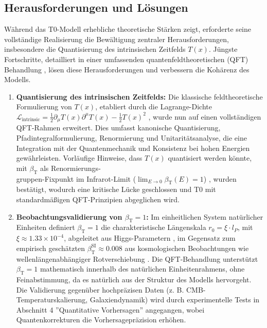 \documentclass[12pt,a4paper]{article}
\newcommand{\Tfield}{T(x)}
\newcommand{\betaT}{\beta_{\text{T}}}
\newcommand{\calL}{\mathcal{L}}
\begin{document}
	\subsection{Herausforderungen und Lösungen}
	\label{subsec:challenges}
	
	Während das T0-Modell erhebliche theoretische Stärken zeigt, erforderte seine vollständige Realisierung die Bewältigung zentraler Herausforderungen, insbesondere die Quantisierung des intrinsischen Zeitfelds \(\Tfield\). Jüngste Fortschritte, detailliert in einer umfassenden quantenfeldtheoretischen (QFT) Behandlung \cite{pascher_qft_2025}, lösen diese Herausforderungen und verbessern die Kohärenz des Modells.
	
	\begin{enumerate}
		\item \textbf{Quantisierung des intrinsischen Zeitfelds:} Die klassische feldtheoretische Formulierung von \(\Tfield\), etabliert durch die Lagrange-Dichte \(\calL_{\text{intrinsic}} = \frac{1}{2}\partial_{\mu}\Tfield\partial^{\mu}\Tfield - \frac{1}{2}\Tfield^2\) \cite{pascher_lagrange_2025}, wurde nun auf einen vollständigen QFT-Rahmen erweitert. Dies umfasst kanonische Quantisierung, Pfadintegralformulierung, Renormierung und Unitaritätsanalyse, die eine Integration mit der Quantenmechanik und Konsistenz bei hohen Energien gewährleisten. Vorläufige Hinweise, dass \(\Tfield\) quantisiert werden könnte, mit \(\betaT\) als Renormierungs-\\gruppen-Fixpunkt im Infrarot-Limit (\(\lim_{E \to 0} \betaT(E) = 1\)) \cite{pascher_alphabeta_2025}, wurden bestätigt, wodurch eine kritische Lücke geschlossen und T0 mit standardmäßigen QFT-Prinzipien abgeglichen wird.
		
		\item \textbf{Beobachtungsvalidierung von \(\betaT = 1\):} Im einheitlichen System natürlicher Einheiten definiert \(\betaT = 1\) die charakteristische Längenskala \(r_0 = \xi \cdot l_P\), mit \(\xi \approx 1.33 \times 10^{-4}\), abgeleitet aus Higgs-Parametern \cite{pascher_params_2025, pascher_alphabeta_2025}, im Gegensatz zum empirisch geschätzten \(\betaT^{\text{SI}} \approx 0.008\) aus kosmologischen Beobachtungen wie wellenlängenabhängiger Rotverschiebung \cite{pascher_messdifferenzen_2025}. Die QFT-Behandlung unterstützt \(\betaT = 1\) mathematisch innerhalb des natürlichen Einheitenrahmens, ohne Feinabstimmung, da es natürlich aus der Struktur des Modells hervorgeht. Die Validierung gegenüber hochpräzisen Daten (z. B. CMB-Temperaturskalierung, Galaxiendynamik) wird durch experimentelle Tests in Abschnitt 4 ''Quantitative Vorhersagen'' angegangen, wobei Quantenkorrekturen die Vorhersagepräzision erhöhen.
	\end{enumerate}
	
\end{document}
